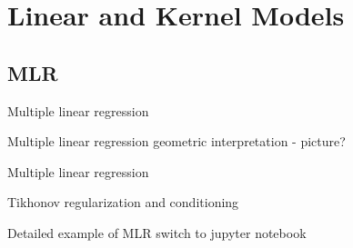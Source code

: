 \section{Linear and Kernel Models}
\subsection{MLR}
\begin{frame}{Multiple linear regression}

\end{frame}
\begin{frame}{Multiple linear regression}
geometric interpretation - picture?
\end{frame}
\begin{frame}{Multiple linear regression}

\end{frame}
\begin{frame}{Tikhonov regularization and conditioning}

\end{frame}
\begin{frame}{Detailed example of MLR}
switch  to jupyter notebook
\end{frame}
%
%
%
%
%
%
%
